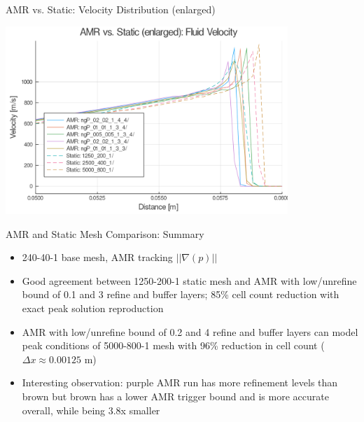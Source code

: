 \begin{frame}{AMR vs. Static: Velocity Distribution (enlarged)}
\begin{center}
\includegraphics[width=0.8\textwidth]{../figs/amrfigs/amrcompare/ue.png}
\end{center}
\end{frame}

\begin{frame}{AMR and Static Mesh Comparison: Summary}
\begin{itemize}
\item 240-40-1 base mesh, AMR tracking $|| \nabla (p)|| $
\item Good agreement between 1250-200-1 static mesh and AMR with low/unrefine bound of 0.1 and 3 refine and buffer layers; 85\% cell count reduction with exact peak solution reproduction
\item AMR with low/unrefine bound of 0.2 and 4 refine and buffer layers can model peak conditions of 5000-800-1 mesh with 96\% reduction in cell count ($\Delta x \approx 0.00125 $ m)
\item Interesting observation: purple AMR run has more refinement levels than brown but brown has a lower AMR trigger bound and is more accurate overall, while being 3.8x smaller
\end{itemize}
\end{frame}

